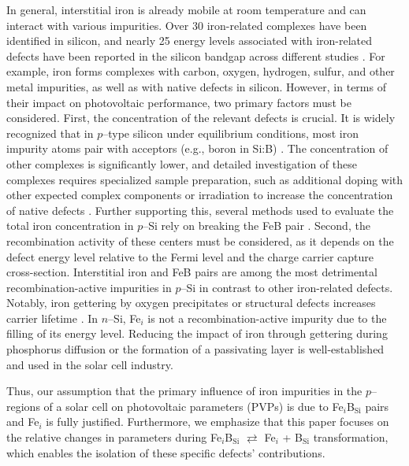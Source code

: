 \documentclass[a4paper,fleqn]{cas-sc}
\begin{document}
In general, interstitial iron is already mobile at room temperature and can interact with various impurities.
Over 30 iron-related complexes have been identified in silicon,
and nearly 25 energy levels associated with iron-related defects have been reported in the silicon bandgap across different studies \cite{Istratov1999,Gwozdz2022,JYOTHI2015}.
For example, iron forms complexes with carbon, oxygen, hydrogen, sulfur, and other metal impurities, as well as with native defects in silicon.
However, in terms of their impact on photovoltaic performance, two primary factors must be considered.
First, the concentration of the relevant defects is crucial.
It is widely recognized that in $p$--type silicon under equilibrium conditions, most iron impurity atoms pair with acceptors
(e.g., boron in Si:B) \cite{Kimerling1983,Istratov1999}.
The concentration of other complexes is significantly lower,
and detailed investigation of these complexes requires specialized sample preparation,
such as additional doping with other expected complex components
or irradiation to increase the concentration of native defects \cite{Tang2013}.
Further supporting this, several methods used to evaluate the total iron concentration in $p$--Si rely on breaking the FeB pair \cite{Zoth1990,FeMethod2012,Olikh2021JAP}.
Second, the recombination activity of these centers must be considered,
as it depends on the defect energy level relative to the Fermi level and the charge carrier capture cross-section.
Interstitial iron and FeB pairs are among the most detrimental recombination-active impurities in $p$--Si \cite{Istratov1999,TeimurazJAP} in contrast to other iron-related defects.
Notably, iron gettering by oxygen precipitates or structural defects increases carrier lifetime \cite{Schoen2011,FeB:Vahanissi}.
In $n$--Si, Fe$_i$ is not a recombination-active impurity due to the filling of its energy level.
Reducing the impact of iron through gettering during phosphorus diffusion \cite{Schoen2011,FeB:Vahanissi,Vaehaenissi2017} or the formation of a
passivating layer \cite{Teimuraz2014JAP} is well-established and used in the solar cell industry.

Thus, our assumption that the primary influence of iron impurities in the $p$--regions of a solar cell on photovoltaic parameters (PVPs) is due to
Fe$_i$B$_\mathrm{Si}$ pairs and Fe$_i$ is fully justified.
Furthermore, we emphasize that this paper focuses on the relative changes in parameters during
Fe$_i$B$_\mathrm{Si}$ $\rightleftarrows$ Fe$_i$ + B$_\mathrm{Si}$ transformation, which enables the isolation of these specific defects' contributions.
\end{document}
